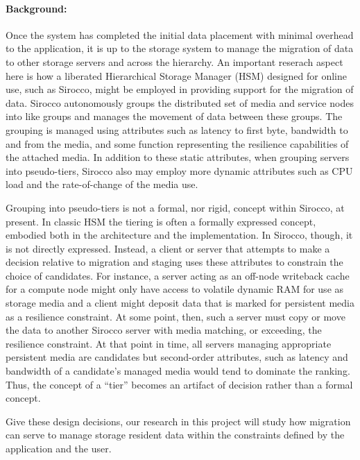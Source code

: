 \paragraph{Background:} 
Once the system has completed the initial data placement with minimal
overhead to the application, it is up to the storage system to manage the
migration of data to other storage servers and across the hierarchy. An
important reserach aspect here is how a liberated Hierarchical Storage
Manager (HSM) designed for online use, such as Sirocco, might be employed in
providing support for the migration of data. Sirocco autonomously groups the
distributed set of media and service nodes into like groups and manages the
movement of data between these groups. The grouping is managed using
attributes such as latency to first byte, bandwidth to and from the media, and
some function representing the resilience capabilities of the attached media.
In addition to these static attributes, when grouping servers into
pseudo-tiers, Sirocco also may employ more dynamic attributes such as CPU load
and the rate-of-change of the media use. 

Grouping into pseudo-tiers is not a formal, nor rigid, concept within
Sirocco, at present. In classic HSM the tiering is often a formally
expressed concept, embodied both in the architecture and the implementation.
In Sirocco, though, it is not directly expressed. Instead, a client or
server that attempts to make a decision relative to migration and staging
uses these attributes to constrain the choice of candidates. For instance, a
server acting as an off-node writeback cache for a compute node might only
have access to volatile dynamic RAM for use as storage media and a client
might deposit data that is marked for persistent media as a resilience
constraint. At some point, then, such a server must copy or move the data to
another Sirocco server with media matching, or exceeding, the resilience
constraint. At that point in time, all servers managing appropriate
persistent media are candidates but second-order attributes, such as latency
and bandwidth of a candidate's managed media would tend to dominate the
ranking. Thus, the concept of a ``tier'' becomes an artifact of decision
rather than a formal concept.

Give these design decisions, our research in this project will study how
migration can serve to manage storage resident data within the constraints
defined by the application and the user. 

